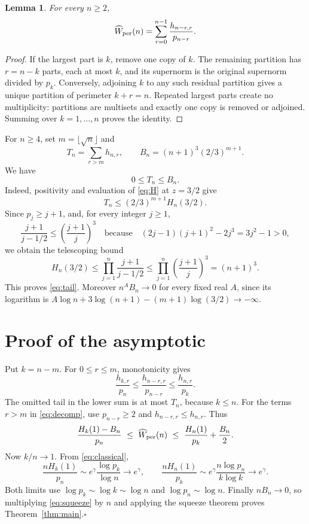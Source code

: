 \documentclass[11pt]{article}
\newtheorem{lemma}{Lemma}
\newcommand{\W}{\widehat W_{\rm per}}
\begin{document}
\begin{lemma}\label{lem:decomp}
For every $n\ge2$,
\begin{equation}\label{eq:decomp}
 \W(n)=\sum_{r=0}^{n-1}\frac{h_{n-r,r}}{p_{n-r}}.
\end{equation}
\end{lemma}
\begin{proof}
If the largest part is $k$, remove one copy of $k$. The remaining partition
has $r=n-k$ parts, each at most $k$, and its supernorm is the original
supernorm divided by $p_k$. Conversely, adjoining $k$ to any such residual
partition gives a unique partition of perimeter $k+r=n$. Repeated largest
parts create no multiplicity: partitions are multisets and exactly one
copy is removed or adjoined. Summing over $k=1,\ldots,n$ proves the identity.
\end{proof}

For $n\ge4$, set $m=\lfloor\sqrt n\rfloor$ and
\[
 T_n=\sum_{r>m}h_{n,r},\qquad
 B_n=(n+1)^3(2/3)^{m+1}.
\]
We have
\begin{equation}\label{eq:tail}
                         0\le T_n\le B_n.
\end{equation}
Indeed, positivity and evaluation of \eqref{eq:H} at $z=3/2$ give
\[
 T_n\le(2/3)^{m+1}H_n(3/2).
\]
Since $p_j\ge j+1$, and, for every integer $j\ge1$,
\[
 \frac{j+1}{j-1/2}\le\left(\frac{j+1}{j}\right)^3
 \quad\text{because}\quad
 (2j-1)(j+1)^2-2j^3=3j^2-1>0,
\]
we obtain the telescoping bound
\[
 H_n(3/2)\le\prod_{j=1}^n\frac{j+1}{j-1/2}
       \le\prod_{j=1}^n\left(\frac{j+1}{j}\right)^3=(n+1)^3.
\]
This proves \eqref{eq:tail}. Moreover $n^A B_n\to0$ for every fixed real
$A$, since its logarithm is
$A\log n+3\log(n+1)-(m+1)\log(3/2)\to-\infty$.

\section*{Proof of the asymptotic}
Put $k=n-m$. For $0\le r\le m$, monotonicity gives
\[
 \frac{h_{k,r}}{p_n}
 \le\frac{h_{n-r,r}}{p_{n-r}}
 \le\frac{h_{n,r}}{p_k}.
\]
The omitted tail in the lower sum is at most $T_n$, because $k\le n$.
For the terms $r>m$ in \eqref{eq:decomp}, use $p_{n-r}\ge2$ and
$h_{n-r,r}\le h_{n,r}$. Thus
\begin{equation}\label{eq:squeeze}
 \frac{H_k(1)-B_n}{p_n}
 \ \le\ \W(n)\ \le\ \frac{H_n(1)}{p_k}+\frac{B_n}{2}.
\end{equation}
Now $k/n\to1$. From \eqref{eq:classical},
\[
 \frac{nH_k(1)}{p_n}
 \sim e^\gamma\frac{\log p_k}{\log n}\longrightarrow e^\gamma,
 \qquad
 \frac{nH_n(1)}{p_k}
 \sim e^\gamma\frac{n\log p_n}{k\log k}\longrightarrow e^\gamma.
\]
Both limits use $\log p_k\sim\log k\sim\log n$ and
$\log p_n\sim\log n$. Finally $nB_n\to0$, so multiplying
\eqref{eq:squeeze} by $n$ and applying the squeeze theorem proves
Theorem~\ref{thm:main}.\hfill$\square$
\end{document}

